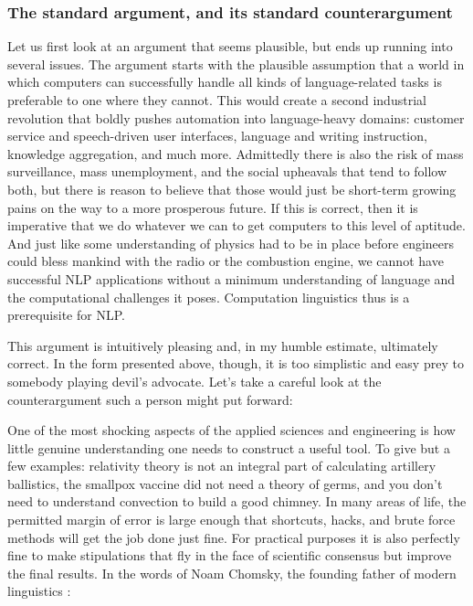 \subsubsection{The standard argument, and its standard counterargument}
\label{sub:formal_arguments_practical_standard}

Let us first look at an argument that seems plausible, but ends up running into several issues.
The argument starts with the plausible assumption that a world in which computers can successfully handle all kinds of language-related tasks is preferable to one where they cannot.
This would create a second industrial revolution that boldly pushes automation into language-heavy domains: customer service and speech-driven user interfaces, language and writing instruction, knowledge aggregation, and much more.
Admittedly there is also the risk of mass surveillance, mass unemployment, and the social upheavals that tend to follow both, but there is reason to believe that those would just be short-term growing pains on the way to a more prosperous future.
If this is correct, then it is imperative that we do whatever we can to get computers to this level of aptitude.
And just like some understanding of physics had to be in place before engineers could bless mankind with the radio or the combustion engine, we cannot have successful NLP applications without a minimum understanding of language and the computational challenges it poses.
Computation linguistics thus is a prerequisite for NLP\@.

This argument is intuitively pleasing and, in my humble estimate, ultimately correct.
In the form presented above, though, it is too simplistic and easy prey to somebody playing devil's advocate.
Let's take a careful look at the counterargument such a person might put forward:

One of the most shocking aspects of the applied sciences and engineering is how little genuine understanding one needs to construct a useful tool.
To give but a few examples: relativity theory is not an integral part of calculating artillery ballistics, the smallpox vaccine did not need a theory of germs, and you don't need to understand convection to build a good chimney.
In many areas of life, the permitted margin of error is large enough that shortcuts, hacks, and brute force methods will get the job done just fine.
For practical purposes it is also perfectly fine to make stipulations that fly in the face of scientific consensus but improve the final results.
In the words of Noam Chomsky, the founding father of modern linguistics \citep[147]{Chomsky90}:

